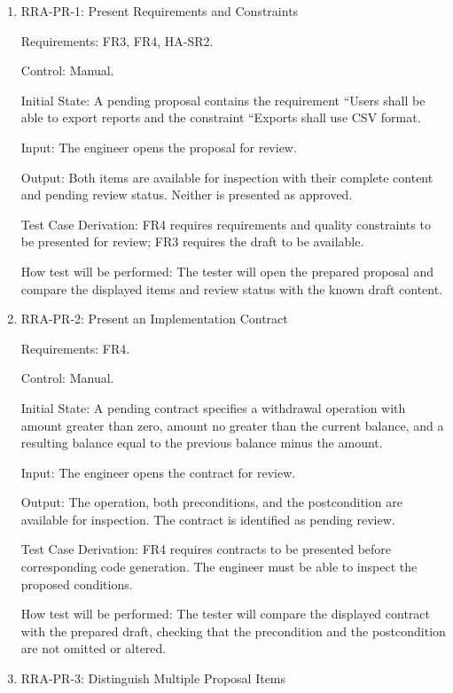 \documentclass[12pt, titlepage]{article}
\begin{document}
\begin{enumerate}

\item{RRA-PR-1: Present Requirements and Constraints\\}

Requirements: FR3, FR4, HA-SR2.

Control: Manual.

Initial State: A pending proposal contains the requirement ``Users shall be
able to export reports and the constraint ``Exports shall use CSV format.

Input: The engineer opens the proposal for review.

Output: Both items are available for inspection with their complete content
and pending review status. Neither is presented as approved.

Test Case Derivation: FR4 requires requirements and quality constraints to be
presented for review; FR3 requires the draft to be available.

How test will be performed: The tester will open the prepared proposal and
compare the displayed items and review status with the known draft content.

\item{RRA-PR-2: Present an Implementation Contract\\}

Requirements: FR4.

Control: Manual.

Initial State: A pending contract specifies a withdrawal operation with amount
greater than zero, amount no greater than the current balance, and a resulting
balance equal to the previous balance minus the amount.

Input: The engineer opens the contract for review.

Output: The operation, both preconditions, and the postcondition are available
for inspection. The contract is identified as pending review.

Test Case Derivation: FR4 requires contracts to be presented before
corresponding code generation. The engineer must be able to inspect the
proposed conditions.

How test will be performed: The tester will compare the displayed contract
with the prepared draft, checking that the precondition and the
postcondition are not omitted or altered.

\item{RRA-PR-3: Distinguish Multiple Proposal Items\\}


\end{enumerate}
\end{document}
